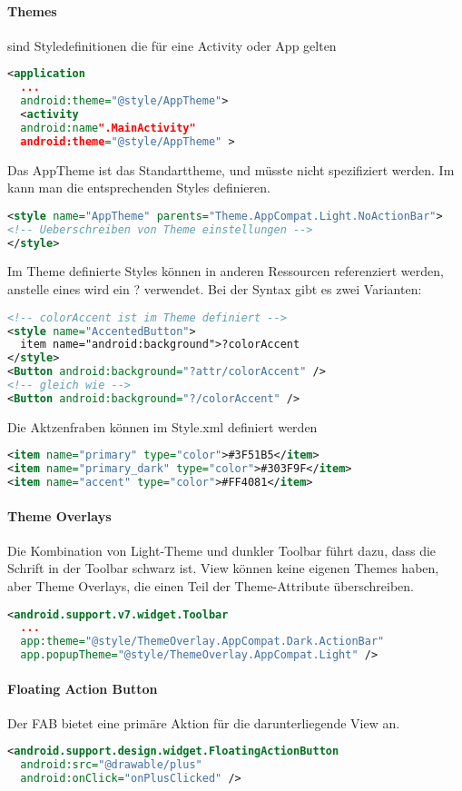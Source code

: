 \paragraph{Themes} sind Styledefinitionen die für eine Activity oder App gelten
\begin{lstlisting}[language=xml]
<application
  ...
  android:theme="@style/AppTheme">
  <activity
  android:name".MainActivity"
  android:theme="@style/AppTheme" >
\end{lstlisting}
Das AppTheme ist das Standarttheme, und müsste nicht spezifiziert werden. Im  kann man die entsprechenden Styles definieren.
\begin{lstlisting}[language=xml]
<style name="AppTheme" parents="Theme.AppCompat.Light.NoActionBar">
<!-- Ueberschreiben von Theme einstellungen -->
</style>
\end{lstlisting}
Im Theme definierte Styles können in anderen Ressourcen referenziert werden, anstelle eines \@ wird ein ? verwendet. Bei der Syntax gibt es zwei Varianten:
\begin{lstlisting}[language=xml]
<!-- colorAccent ist im Theme definiert -->
<style name="AccentedButton">
  item name="android:background">?colorAccent
</style>
<Button android:background="?attr/colorAccent" />
<!-- gleich wie -->
<Button android:background="?/colorAccent" />
\end{lstlisting}


Die Aktzenfraben können im Style.xml definiert werden
\begin{lstlisting}[language=xml]
<item name="primary" type="color">#3F51B5</item>
<item name="primary_dark" type="color">#303F9F</item>
<item name="accent" type="color">#FF4081</item>
\end{lstlisting}
\paragraph{Theme Overlays} Die Kombination von Light-Theme und dunkler Toolbar führt dazu, dass die Schrift in der Toolbar schwarz ist. View können keine eigenen Themes haben, aber Theme Overlays, die einen Teil der Theme-Attribute überschreiben.
\begin{lstlisting}[language=xml]
<android.support.v7.widget.Toolbar
  ...
  app:theme="@style/ThemeOverlay.AppCompat.Dark.ActionBar"
  app.popupTheme="@style/ThemeOverlay.AppCompat.Light" />
\end{lstlisting}
\paragraph{Floating Action Button} Der FAB bietet eine primäre Aktion für die darunterliegende View an.
\begin{lstlisting}[language=xml]
<android.support.design.widget.FloatingActionButton
  android:src="@drawable/plus"
  android:onClick="onPlusClicked" />
\end{lstlisting}
